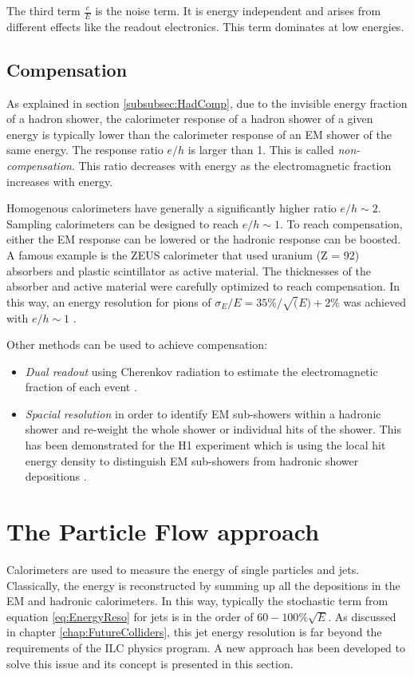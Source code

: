 The third term $\frac{c}{E}$ is the noise term. It is energy independent and arises from different effects like the readout electronics. This term dominates at low energies.

\subsection{Compensation}
\label{subsec:Compensation}

As explained in section \ref{subsubsec:HadComp}, due to the invisible energy fraction of a hadron shower, the calorimeter response of a hadron shower of a given energy is typically lower than the calorimeter response of an EM shower of the same energy. The response ratio $e/h$ is larger than 1. This is called \textit{non-compensation}. This ratio decreases with energy as the electromagnetic fraction increases with energy.

Homogenous calorimeters have generally a significantly higher ratio $e/h \sim 2$. Sampling calorimeters can be designed to reach $e/h \sim 1$. To reach compensation, either the EM response can be lowered or the hadronic response can be boosted. A famous example is the ZEUS calorimeter that used uranium (Z = 92) absorbers and plastic scintillator as active material. The thicknesses of the absorber and active material were carefully optimized to reach compensation. In this way, an energy resolution for pions of $\sigma_E/E = 35\%/\sqrt(E) + 2\%$ was achieved with $e/h \sim 1$ \cite{BERNSTEIN199323}.

Other methods can be used to achieve compensation:
\begin{itemize}
  \item \textit{Dual readout} using Cherenkov radiation to estimate the electromagnetic fraction of each event \cite{Akchurin:2013yaa}.
  \item \textit{Spacial resolution} in order to identify EM sub-showers within a hadronic shower and re-weight the whole shower or individual hits of the shower. This has been demonstrated for the H1 experiment which is using the local hit energy density to distinguish EM sub-showers from hadronic shower depositions \cite{Schacht:1990zw}.
\end{itemize}

\section{The Particle Flow approach}
\label{sec:PFA}

Calorimeters are used to measure the energy of single particles and jets. Classically, the energy is reconstructed by summing up all the depositions in the EM and hadronic calorimeters. In this way, typically the stochastic term from equation \ref{eq:EnergyReso} for jets is in the order of $60-100\%\sqrt{E}$. As discussed in chapter \ref{chap:FutureColliders}, this jet energy resolution is far beyond the requirements of the ILC physics program. A new approach has been developed to solve this issue and its concept is presented in this section.

